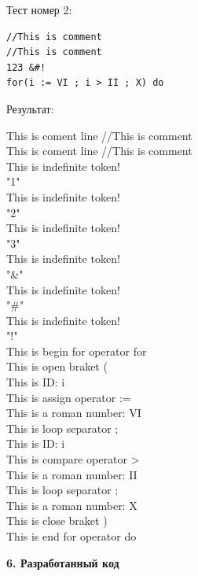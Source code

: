 \documentclass[12pt]{report}
\begin{document}
\begin{center}
Тест номер 2:
\end{center}
\begin{verbatim}
//This is comment
//This is comment
123 &#!
for(i := VI ; i > II ; X) do
\end{verbatim}
\text{}\newline
\begin{center}
    Результат:\\
\end{center}
This is coment line             //This is comment \\
This is coment line             //This is comment \\
This is indefinite token!\\
        "1"\\
This is indefinite token!\\
        "2"\\
This is indefinite token!\\
        "3"\\
This is indefinite token!\\
        "&"\\
This is indefinite token!\\
        "#"\\
This is indefinite token!\\
        "!"\\
This is begin for operator      for\\
This is open braket             (\\
This is ID:                 i\\
This is assign operator :=\\
This is a roman number: VI\\
This is loop separator          ;\\
This is ID:                 i\\
This is compare operator        >\\
This is a roman number: II\\
This is loop separator          ;\\
This is a roman number: X\\
This is close braket            )\\
This is end for operator        do\\
\hline 
\begin{center}
\Large{\textbf{6. Разработанный код}}
\end{center}
\end{document}
